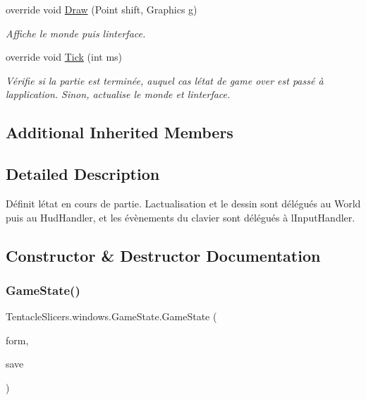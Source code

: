 \begin{DoxyCompactItemize}
override void \hyperlink{class_tentacle_slicers_1_1windows_1_1_game_state_a5430584218158416e4f3c34cf6151d30}{Draw} (Point shift, Graphics g)
\begin{DoxyCompactList}\small\item\em Affiche le monde puis l\textquotesingle{}interface. \end{DoxyCompactList}\item 
override void \hyperlink{class_tentacle_slicers_1_1windows_1_1_game_state_a395b822a8a2435ae6c3dfe22ce733f59}{Tick} (int ms)
\begin{DoxyCompactList}\small\item\em Vérifie si la partie est terminée, auquel cas l\textquotesingle{}état de game over est passé à l\textquotesingle{}application. Sinon, actualise le monde et l\textquotesingle{}interface. \end{DoxyCompactList}\end{DoxyCompactItemize}
\subsection*{Additional Inherited Members}


\subsection{Detailed Description}
Définit l\textquotesingle{}état en cours de partie. L\textquotesingle{}actualisation et le dessin sont délégués au World puis au Hud\+Handler, et les évènements du clavier sont délégués à l\textquotesingle{}Input\+Handler. 



\subsection{Constructor \& Destructor Documentation}
\mbox{\label{class_tentacle_slicers_1_1windows_1_1_game_state_a040ca1d4586473de5d08f351494df8ba}} 
\subsubsection{\texorpdfstring{Game\+State()}{GameState()}\hspace{0.1cm}{\footnotesize\ttfamily [1/2]}}
{\footnotesize\ttfamily Tentacle\+Slicers.\+windows.\+Game\+State.\+Game\+State (\begin{DoxyParamCaption}\item[{\hyperlink{class_tentacle_slicers_1_1windows_1_1_main_form}{Main\+Form}}]{form,  }\item[{\hyperlink{class_tentacle_slicers_1_1maps_1_1_game_save}{Game\+Save}}]{save }\end{DoxyParamCaption})}



